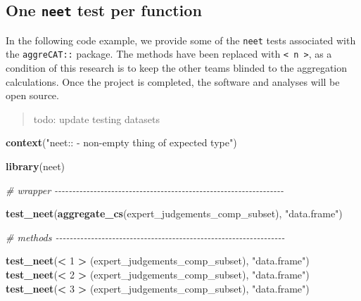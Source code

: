 \documentclass[
]{article}
\newenvironment{Shaded}{\begin{snugshade}}{\end{snugshade}}
\newcommand{\CommentTok}[1]{\textcolor[rgb]{0.56,0.35,0.01}{\textit{#1}}}
\newcommand{\DecValTok}[1]{\textcolor[rgb]{0.00,0.00,0.81}{#1}}
\newcommand{\KeywordTok}[1]{\textcolor[rgb]{0.13,0.29,0.53}{\textbf{#1}}}
\newcommand{\NormalTok}[1]{#1}
\newcommand{\OperatorTok}[1]{\textcolor[rgb]{0.81,0.36,0.00}{\textbf{#1}}}
\newcommand{\StringTok}[1]{\textcolor[rgb]{0.31,0.60,0.02}{#1}}
\begin{document}
\hypertarget{one-neet-test-per-function}{%
\subsection{\texorpdfstring{One \texttt{neet} test per function}{One neet test per function}}\label{one-neet-test-per-function}}

In the following code example, we provide some of the \texttt{neet} tests associated with the \texttt{aggreCAT::} package. The methods have been replaced with \texttt{\textless{}\ n\ \textgreater{}}, as a condition of this research is to keep the other teams blinded to the aggregation calculations. Once the project is completed, the software and analyses will be open source.

\begin{quote}
todo: update testing datasets
\end{quote}

\begin{Shaded}
\begin{Highlighting}[]
\KeywordTok{context}\NormalTok{(}\StringTok{"neet:: {-} non{-}empty thing of expected type"}\NormalTok{)}

\KeywordTok{library}\NormalTok{(neet)}


\CommentTok{\# wrapper {-}{-}{-}{-}{-}{-}{-}{-}{-}{-}{-}{-}{-}{-}{-}{-}{-}{-}{-}{-}{-}{-}{-}{-}{-}{-}{-}{-}{-}{-}{-}{-}{-}{-}{-}{-}{-}{-}{-}{-}{-}{-}{-}{-}{-}{-}{-}{-}{-}{-}{-}{-}{-}{-}{-}{-}{-}{-}{-}{-}{-}{-}{-}{-}{-}}

\KeywordTok{test\_neet}\NormalTok{(}\KeywordTok{aggregate\_cs}\NormalTok{(expert\_judgements\_comp\_subset), }\StringTok{"data.frame"}\NormalTok{)}

\CommentTok{\# methods {-}{-}{-}{-}{-}{-}{-}{-}{-}{-}{-}{-}{-}{-}{-}{-}{-}{-}{-}{-}{-}{-}{-}{-}{-}{-}{-}{-}{-}{-}{-}{-}{-}{-}{-}{-}{-}{-}{-}{-}{-}{-}{-}{-}{-}{-}{-}{-}{-}{-}{-}{-}{-}{-}{-}{-}{-}{-}{-}{-}{-}{-}{-}{-}{-}}

\KeywordTok{test\_neet}\NormalTok{(}\OperatorTok{<}\StringTok{ }\DecValTok{1} \OperatorTok{>}\StringTok{ }\NormalTok{(expert\_judgements\_comp\_subset), }\StringTok{"data.frame"}\NormalTok{)}
\KeywordTok{test\_neet}\NormalTok{(}\OperatorTok{<}\StringTok{ }\DecValTok{2} \OperatorTok{>}\StringTok{ }\NormalTok{(expert\_judgements\_comp\_subset), }\StringTok{"data.frame"}\NormalTok{)}
\KeywordTok{test\_neet}\NormalTok{(}\OperatorTok{<}\StringTok{ }\DecValTok{3} \OperatorTok{>}\StringTok{ }\NormalTok{(expert\_judgements\_comp\_subset), }\StringTok{"data.frame"}\NormalTok{)}
\end{Highlighting}
\end{Shaded}
\end{document}
